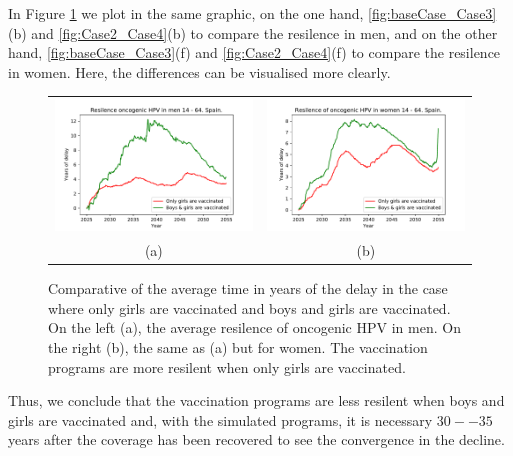 In Figure \ref{fig:compara_resilencia} we plot in the same graphic, on the one hand,  \ref{fig:baseCase_Case3}(b) and \ref{fig:Case2_Case4}(b) to compare the resilence in men, and on the other hand, \ref{fig:baseCase_Case3}(f) and \ref{fig:Case2_Case4}(f) to compare the resilence in women. Here, the differences can be visualised more clearly.

\begin{figure}[!]
	\centering
	\begin{tabular}{cc}
		\includegraphics[width=0.5\linewidth]{IMGs/11.-Resilencia/compara_resilencia_onco_hom.pdf}	& 
		\includegraphics[width=0.5\linewidth]{IMGs/11.-Resilencia/compara_resilencia_onco_muj.pdf}  \\ 
		(a)	& (b) \\ 
	\end{tabular} 
	\caption{Comparative of the average time in years of the delay in the case where only girls are vaccinated and boys and girls are vaccinated. On the left (a), the average resilence of oncogenic HPV in men. On the right (b), the same as (a) but for women. The vaccination programs are more resilent when only girls are vaccinated.}
	\label{fig:compara_resilencia}
\end{figure}

Thus, we conclude that the vaccination programs are less resilent when boys and girls are vaccinated and, with the simulated programs, it is necessary $30--35$ years after the coverage has been recovered to see the convergence in the decline.
